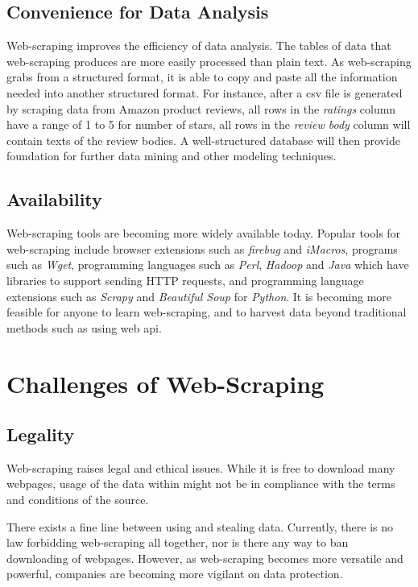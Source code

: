 \documentclass[12pt]{report}
\begin{document}
\subsection{Convenience for Data Analysis}

Web-scraping improves the efficiency of data analysis. The tables of data that web-scraping produces are more easily processed than plain text. As web-scraping grabs from a structured format, it is able to copy and paste all the information needed into another structured format. For instance, after a \gls{csv} file is generated by scraping data from Amazon product reviews, all rows in the \textit{ratings} column have a range of 1 to 5 for number of stars, all rows in the \textit{review body} column will contain texts of the review bodies. A well-structured database will then provide foundation for further data \gls{mining} and other modeling techniques.

\subsection{Availability}

Web-scraping tools are becoming more widely available today. Popular tools for web-scraping include browser extensions such as \textit{firebug} and \textit{iMacros}, programs such as \textit{Wget}, programming languages such as \textit{Perl}, \textit{Hadoop} and \textit{Java} which have libraries to support sending HTTP requests, and programming language extensions such as \textit{Scrapy} and \textit{Beautiful Soup} for \textit{Python}. It is becoming more feasible for anyone to learn web-scraping, and to \gls{harvest} data beyond traditional methods such as using web \gls{api}.

\section{Challenges of Web-Scraping}

\subsection{Legality}

Web-scraping raises legal and ethical issues. While it is free to download many webpages, usage of the data within might not be in compliance with the terms and conditions of the source. 

There exists a fine line between using and stealing data. Currently, there is no law forbidding web-scraping all together, nor is there any way to ban downloading of webpages. However, as web-scraping becomes more versatile and powerful, companies are becoming more vigilant on data protection. 
\end{document}
